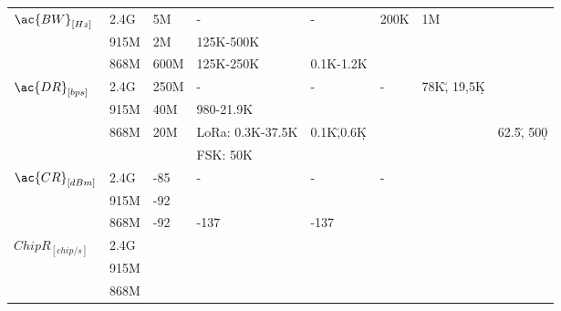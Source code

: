 \begin{longtable}{l|l|l|l|l|l|l|l}
	\multirow{3}{*}{$\ac{BW}_{[Hz]}$}  & 2.4G             & 5M           & -                & -             & 200K        & 1M                 & \ko             \\
	\                                  & 915M             & 2M           & 125K-500K        & \ko           & \ko         & \ko                & \ko             \\
	\                                  & 868M             & 600M         & 125K-250K        & 0.1K-1.2K     & \ko         & \ko                & \ko             \\\hline
	\multirow{3}{*}{$\ac{DR}_{[bps]}$} & 2.4G             & 250M         & -                & -             & -           & 78K\u, 19,5K\d     & \ko             \\
	\                                  & 915M             & 40M          & 980-21.9K        & \ko           & \ko         & \ko                & \ko             \\
	\                                  & 868M             & 20M          & LoRa: 0.3K-37.5K & 0.1K\u,0.6K\d & \ko         & \ko                & 62.5\u, 500\d   \\
	\                                  &                  &              & FSK:	50K         &               &             &                    &                 \\\hline
	\multirow{3}{*}{$\ac{CR}_{[dBm]}$} & 2.4G             & -85          & -                & -             & -           & \ko                & \ko             \\
	\                                  & 915M             & -92          & \ko              & \ko           & \ko         & \ko                & \ko             \\
	\                                  & 868M             & -92          & -137             & -137          & \ko         & \ko                & \ko             \\\hline
	\multirow{3}{*}{$Chip R_{[chip/s]}$} & 2.4G           &              &                  &               &             &                    &                 \\
	\                                  & 915M             &              &        	        &               &             &                    &                 \\
	\                                  & 868M             &              &                  &               &             &                    &                 \\\hline

\end{longtable}
